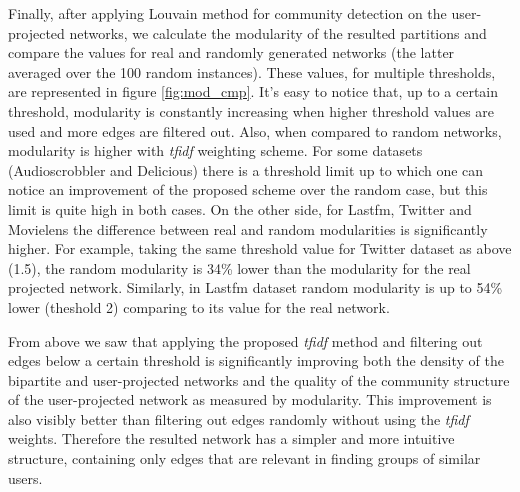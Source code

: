 Finally, after applying Louvain method for community detection on the
user-projected networks, we calculate the modularity of the resulted
partitions and compare the values for real and randomly generated networks (the
latter averaged over the 100 random instances). These values, for multiple
thresholds, are represented in figure \ref{fig:mod_cmp}. It's easy to notice
that, up to a certain threshold, modularity is constantly increasing when
higher threshold values are used and more edges are filtered out. Also, when
compared to random networks, modularity is higher with \emph{tfidf}
weighting scheme. For some datasets (Audioscrobbler and Delicious) there is a
threshold limit up to which one can notice an improvement of the proposed scheme
over the random case, but this limit is quite high in both cases. On the
other side, for Lastfm, Twitter and Movielens the difference between
real and random modularities is significantly higher. For example, taking the
same threshold value for Twitter dataset as above (1.5), the random modularity
is 34\% lower than the modularity for the real projected network. Similarly, in
Lastfm dataset random modularity is up to 54\% lower (theshold 2) comparing to
its value for the real network.

From above we saw that applying the proposed \emph{tfidf} method and filtering
out edges below a certain threshold is significantly improving both the density
of the bipartite and user-projected networks and the quality of the community
structure of the user-projected network as measured by modularity. This
improvement is also visibly better than filtering out edges randomly without
using the \emph{tfidf} weights. Therefore the resulted network has a simpler and
more intuitive structure, containing only edges that are relevant in finding
groups of similar users.
